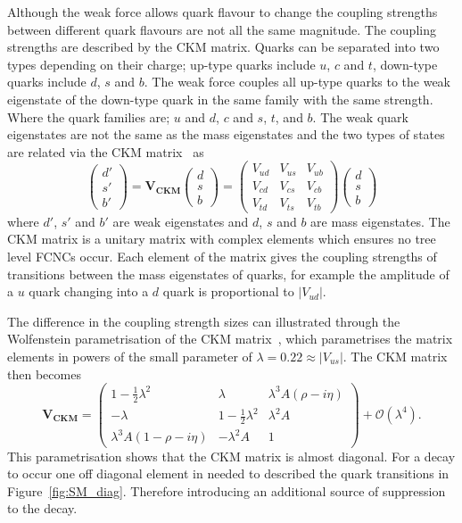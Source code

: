 Although the weak force allows quark flavour to change the coupling strengths between different quark flavours are not all the same magnitude. The coupling strengths are described by the CKM matrix. Quarks can be separated into two types depending on their charge; up-type quarks include $u$, $c$ and $t$, down-type quarks include $d$, $s$ and $b$. The weak force couples all up-type quarks to the weak eigenstate of the down-type quark in the same family with the same strength. Where the quark families are; $u$ and $d$, $c$ and $s$, $t$, and $b$. The weak quark eigenstates are not the same as the mass eigenstates and the two types of states are related via the CKM matrix~\cite{PhysRevLett.10.531,doi:10.1143/PTP.49.652} as
\begin{equation}
\begin{pmatrix}
d'\\
s'\\
b'
\end{pmatrix}
= 
\mathbf{V_{CKM}}
\begin{pmatrix}
d\\
s\\
b
\end{pmatrix} =
 \begin{pmatrix}
   V_{ud} & V_{us} & V_{ub} \\
   V_{cd} & V_{cs} & V_{cb} \\
   V_{td} & V_{ts} & V_{tb}
 \end{pmatrix}
\begin{pmatrix}
d\\
s\\
b
\end{pmatrix}
\label{eq:CKMA}
\end{equation}
where $d'$, $s'$ and $b'$ are weak eigenstates and $d$, $s$ and $b$ are mass eigenstates. The CKM matrix is a unitary matrix with complex elements which ensures no tree level FCNCs occur. Each element of the matrix gives the coupling strengths of transitions between the mass eigenstates of quarks, for example the amplitude of a $u$ quark changing into a $d$ quark is proportional to $|V_{ud}|$.

The difference in the coupling strength sizes can illustrated through the Wolfenstein parametrisation of the CKM matrix~\cite{PhysRevLett.51.1945}, which parametrises the matrix elements in powers of the small parameter of $\lambda = 0.22 \approx |V_{us}|$. The CKM matrix then becomes
\begin{equation}
\mathbf{V_{CKM}} =
 \begin{pmatrix}
 1 - \frac{1}{2}\lambda^2 & \lambda & \lambda^3 A (\rho - i \eta) \\
 - \lambda                & 1 - \frac{1}{2}\lambda^2 & \lambda^2 A \\
 \lambda^3 A (1 - \rho- i \eta) & -\lambda^2 A & 1
 \end{pmatrix} + \mathcal{O}(\lambda^4).
\label{eq:CKMB}
\end{equation}
This parametrisation shows that the CKM matrix is almost diagonal. For a \bmumu decay to occur one off diagonal element in needed to described the quark transitions in Figure~\ref{fig:SM_diag}. Therefore introducing an additional source of suppression to the decay. 

